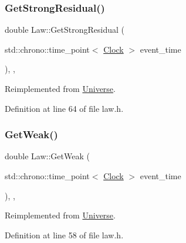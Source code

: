 \mbox{\label{class_law_a70fb2a7710776c4e2315a1e29fe35eb6}} 
\subsubsection{\texorpdfstring{Get\+Strong\+Residual()}{GetStrongResidual()}}
{\footnotesize\ttfamily double Law\+::\+Get\+Strong\+Residual (\begin{DoxyParamCaption}\item[{std\+::chrono\+::time\+\_\+point$<$ \hyperlink{universe_8h_a0ef8d951d1ca5ab3cfaf7ab4c7a6fd80}{Clock} $>$}]{event\+\_\+time }\end{DoxyParamCaption})\hspace{0.3cm}{\ttfamily [inline]}, {\ttfamily [final]}, {\ttfamily [virtual]}}



Reimplemented from \hyperlink{class_universe_af0f4b81950061e63c2855eb40957a5b1}{Universe}.



Definition at line 64 of file law.\+h.

\mbox{\label{class_law_a303c365b7a17997a63a74756fc72fba3}} 
\subsubsection{\texorpdfstring{Get\+Weak()}{GetWeak()}}
{\footnotesize\ttfamily double Law\+::\+Get\+Weak (\begin{DoxyParamCaption}\item[{std\+::chrono\+::time\+\_\+point$<$ \hyperlink{universe_8h_a0ef8d951d1ca5ab3cfaf7ab4c7a6fd80}{Clock} $>$}]{event\+\_\+time }\end{DoxyParamCaption})\hspace{0.3cm}{\ttfamily [inline]}, {\ttfamily [final]}, {\ttfamily [virtual]}}



Reimplemented from \hyperlink{class_universe_a4476b7e0a3fc1764909f556257fd9ec7}{Universe}.



Definition at line 58 of file law.\+h.

\mbox{\label{class_law_aad6e54da64a5d8499dcb6c232aa6748f}} 
